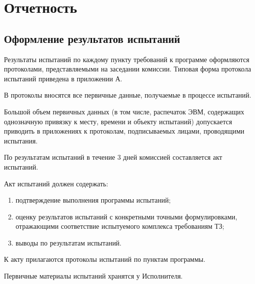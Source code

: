 \section{Отчетность}

\subsection{Оформление результатов испытаний}
Результаты испытаний по каждому пункту требований к программе оформляются протоколами, представляемыми на заседании комиссии. Типовая форма протокола испытаний приведена в приложении А.

В протоколы вносятся все первичные данные, получаемые в процессе испытаний.

Большой объем первичных данных (в том числе, распечаток ЭВМ, содержащих однозначную привязку к месту, времени и объекту испытаний) допускается приводить в приложениях к протоколам, подписываемых лицами, проводящими испытания.

По результатам испытаний в течение 3 дней комиссией составляется акт испытаний.

Акт испытаний должен содержать:
\begin{enumerate}
    \item подтверждение выполнения программы испытаний;
    \item оценку результатов испытаний с конкретными точными формулировками, отражающими соответствие испытуемого комплекса требованиям ТЗ;
    \item выводы по результатам испытаний.
\end{enumerate}

К акту прилагаются протоколы испытаний по пунктам программы.

Первичные материалы испытаний хранятся у Исполнителя.

